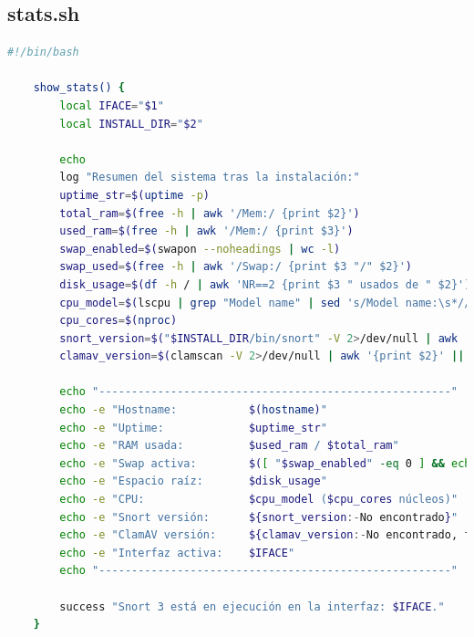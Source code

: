\documentclass[11pt,a4paper,twoside]{report}
\begin{document}
\subsection*{stats.sh}
\begin{lstlisting}[language=bash, caption={stats.sh}, label={lst:stats-sh}]
	#!/bin/bash
	
	show_stats() {
		local IFACE="$1"
		local INSTALL_DIR="$2"
		
		echo
		log "Resumen del sistema tras la instalación:"
		uptime_str=$(uptime -p)
		total_ram=$(free -h | awk '/Mem:/ {print $2}')
		used_ram=$(free -h | awk '/Mem:/ {print $3}')
		swap_enabled=$(swapon --noheadings | wc -l)
		swap_used=$(free -h | awk '/Swap:/ {print $3 "/" $2}')
		disk_usage=$(df -h / | awk 'NR==2 {print $3 " usados de " $2}')
		cpu_model=$(lscpu | grep "Model name" | sed 's/Model name:\s*//')
		cpu_cores=$(nproc)
		snort_version=$("$INSTALL_DIR/bin/snort" -V 2>/dev/null | awk '/Version/{print $4; exit}' || echo "No encontrado")
		clamav_version=$(clamscan -V 2>/dev/null | awk '{print $2}' || echo "No encontrado")
		
		echo "------------------------------------------------------"
		echo -e "Hostname:           $(hostname)"
		echo -e "Uptime:             $uptime_str"
		echo -e "RAM usada:          $used_ram / $total_ram"
		echo -e "Swap activa:        $([ "$swap_enabled" -eq 0 ] && echo "No" || echo "Sí ($swap_used)")"
		echo -e "Espacio raíz:       $disk_usage"
		echo -e "CPU:                $cpu_model ($cpu_cores núcleos)"
		echo -e "Snort versión:      ${snort_version:-No encontrado}"
		echo -e "ClamAV versión:     ${clamav_version:-No encontrado, falta instalar}"
		echo -e "Interfaz activa:    $IFACE"
		echo "------------------------------------------------------"
		
		success "Snort 3 está en ejecución en la interfaz: $IFACE."
	}
\end{lstlisting}
\end{document}
